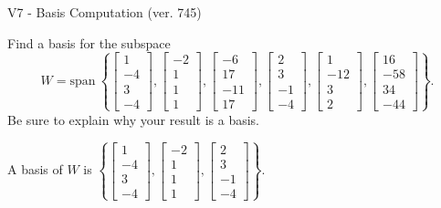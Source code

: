 \begin{exercise}
  \begin{exerciseTitle}V7 - Basis Computation (ver. 745)\end{exerciseTitle}
  \begin{exerciseStatement}
    Find a basis for the subspace 
\[W=\mathrm{span}\ \left\{\left[\begin{array}{r}
1 \\
-4 \\
3 \\
-4
\end{array}\right] , \left[\begin{array}{r}
-2 \\
1 \\
1 \\
1
\end{array}\right] , \left[\begin{array}{r}
-6 \\
17 \\
-11 \\
17
\end{array}\right] , \left[\begin{array}{r}
2 \\
3 \\
-1 \\
-4
\end{array}\right] , \left[\begin{array}{r}
1 \\
-12 \\
3 \\
2
\end{array}\right] , \left[\begin{array}{r}
16 \\
-58 \\
34 \\
-44
\end{array}\right]\right\}.\]
 Be sure to explain why your result is a basis.


  \end{exerciseStatement}
  \begin{exerciseAnswer}
   A basis of \(W\) is  \(\left\{\left[\begin{array}{r}
1 \\
-4 \\
3 \\
-4
\end{array}\right] , \left[\begin{array}{r}
-2 \\
1 \\
1 \\
1
\end{array}\right] , \left[\begin{array}{r}
2 \\
3 \\
-1 \\
-4
\end{array}\right]\right\}\).
  


  \end{exerciseAnswer}
\end{exercise}